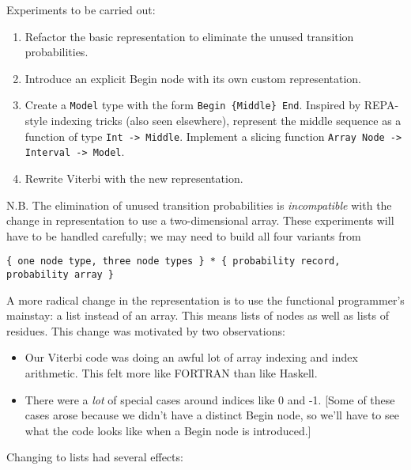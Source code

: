 Experiments to be carried out:

\begin{enumerate}[1.]
\item
  Refactor the basic representation to eliminate the unused transition
  probabilities.
\item
  Introduce an explicit Begin node with its own custom representation.
\item
  Create a \texttt{Model} type with the form
  \texttt{Begin \{Middle\} End}. Inspired by REPA-style indexing tricks
  (also seen elsewhere), represent the middle sequence as a function of
  type \texttt{Int -\textgreater{}     Middle}. Implement a slicing
  function
  \texttt{Array Node -\textgreater{} Interval -\textgreater{}     Model}.
\item
  Rewrite Viterbi with the new representation.
\end{enumerate}

N.B. The elimination of unused transition probabilities is
\emph{incompatible} with the change in representation to use a
two-dimensional array. These experiments will have to be handled
carefully; we may need to build all four variants from

\begin{verbatim}
{ one node type, three node types } * { probability record, probability array }
\end{verbatim}

A more radical change in the representation is to use the functional
programmer's mainstay: a list instead of an array. This means lists of
nodes as well as lists of residues. This change was motivated by two
observations:

\begin{itemize}
\item
  Our Viterbi code was doing an awful lot of array indexing and index
  arithmetic. This felt more like FORTRAN than like Haskell.
\item
  There were a \emph{lot} of special cases around indices like 0 and -1.
  {[}Some of these cases arose because we didn't have a distinct Begin
  node, so we'll have to see what the code looks like when a Begin node
  is introduced.{]}
\end{itemize}

Changing to lists had several effects:

